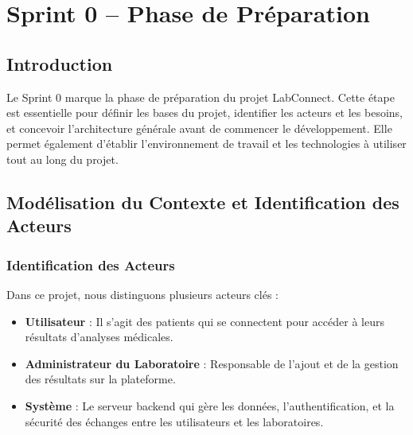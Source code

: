 \documentclass[12pt,a4paper]{report}
\begin{document}
\chapter{Sprint 0 – Phase de Préparation}

\section{Introduction}
Le Sprint 0 marque la phase de préparation du projet LabConnect. Cette étape est essentielle pour définir les bases du projet, identifier les acteurs et les besoins, et concevoir l'architecture générale avant de commencer le développement. Elle permet également d'établir l'environnement de travail et les technologies à utiliser tout au long du projet.

\section{Modélisation du Contexte et Identification des Acteurs}

\subsection{Identification des Acteurs}
Dans ce projet, nous distinguons plusieurs acteurs clés :

\begin{itemize}
    \item \textbf{Utilisateur} : Il s'agit des patients qui se connectent pour accéder à leurs résultats d'analyses médicales.
    
    \item \textbf{Administrateur du Laboratoire} : Responsable de l'ajout et de la gestion des résultats sur la plateforme.
    
    \item \textbf{Système} : Le serveur backend qui gère les données, l'authentification, et la sécurité des échanges entre les utilisateurs et les laboratoires.
\end{itemize}
\end{document}
